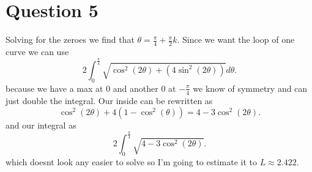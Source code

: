 \documentclass{report}
\begin{document}
\section{Question 5}%
\label{sec:Question 5}
Solving for the zeroes we find that $ \theta=\frac{ \pi }{ 4 } + \frac{ \pi }{ 2 } k $. Since we want the loop of one curve we can use \[
2 \int_{ 0 }^{ \frac{ \pi }{ 4 }  } \sqrt{ \cos^{ 2 } \left( 2\theta \right) + \left( 4\sin^{ 2 } \left( 2\theta \right)  \right)  } d\theta
.\] 
because we have a max at $ 0 $ and another 0 at $ -\frac{ \pi }{ 4 }  $ we know of symmetry and can just double the integral. Our inside can be rewritten as 
\[
\cos^{ 2 } \left( 2\theta \right) +4\left( 1-\cos^{ 2 } \left( \theta \right)  \right)  = 4-3\cos^{ 2 } \left( 2\theta \right) 
.\] 
and our integral as 
\[
2 \int_{ 0 }^{ \frac{ \pi }{ 4 }  } \sqrt{  4-3\cos^{ 2 } \left( 2\theta \right)  } 
.\] 
which doesnt look any easier to solve so I'm going to estimate it to $ L \approx 2.422 $. 
\end{document}
